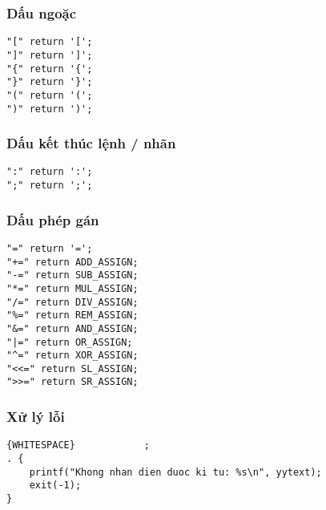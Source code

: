 \documentclass[../report.tex]{subfiles}
\begin{document}
\subsubsection{Dấu ngoặc}
\begin{lstlisting}
"[" return '[';
"]" return ']';
"{" return '{';
"}" return '}';
"(" return '(';
")" return ')';
\end{lstlisting}

\subsubsection{Dấu kết thúc lệnh / nhãn}
\begin{lstlisting}
":" return ':';
";" return ';';
\end{lstlisting}

\subsubsection{Dấu phép gán}
\begin{lstlisting}
"=" return '=';
"+=" return ADD_ASSIGN;
"-=" return SUB_ASSIGN;
"*=" return MUL_ASSIGN;
"/=" return DIV_ASSIGN;
"%=" return REM_ASSIGN;
"&=" return AND_ASSIGN;
"|=" return OR_ASSIGN;
"^=" return XOR_ASSIGN;
"<<=" return SL_ASSIGN;
">>=" return SR_ASSIGN;
\end{lstlisting}

\subsubsection{Xử lý lỗi}
\begin{lstlisting}
{WHITESPACE}            ;
. { 
    printf("Khong nhan dien duoc ki tu: %s\n", yytext);
    exit(-1); 
}
\end{lstlisting}
\end{document}
